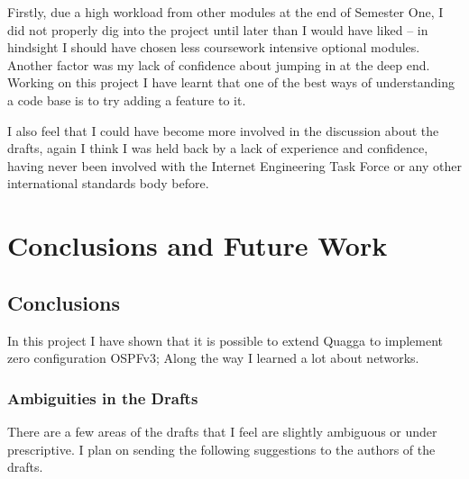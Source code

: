 \documentclass[12pt,a4paper,twoside]{report}
\begin{document}
Firstly, due a high workload from other modules at the end of Semester One, I
did not properly dig into the project until later than I would have liked -- in
hindsight I should have chosen  less coursework intensive optional modules.
Another factor was my lack of confidence about jumping in at the deep end.
Working on this project I have learnt that one of the best ways of understanding
a code base is to try adding a feature to it.

I also feel that I could have become more involved in the discussion about the
drafts, again I think I was held back by a lack of experience and confidence,
having never been involved with the Internet Engineering Task Force or any
other international standards body before. 
 
\chapter{Conclusions and Future Work}

\section{Conclusions}
In this project I have shown that it is possible to extend Quagga to implement
zero configuration OSPFv3; Along the way I learned a lot about networks. 

\subsection{Ambiguities in the Drafts}
There are a few areas of the drafts that I feel are slightly ambiguous or under
prescriptive. I plan on sending the following suggestions to the authors of the
drafts.
\end{document}
